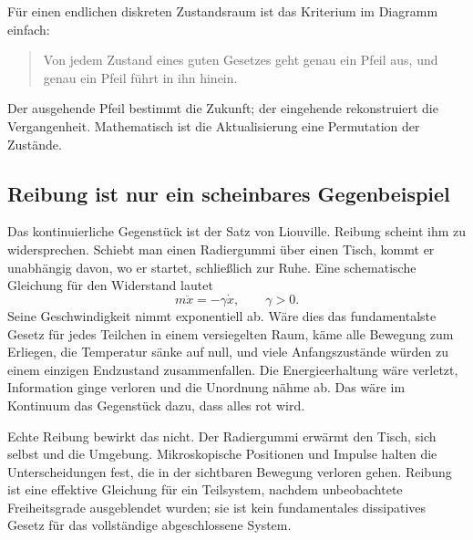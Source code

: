 Für einen endlichen diskreten Zustandsraum ist das Kriterium im Diagramm einfach:
\begin{quote}
Von jedem Zustand eines guten Gesetzes geht genau ein Pfeil aus, und genau ein Pfeil führt in ihn hinein.
\end{quote}
Der ausgehende Pfeil bestimmt die Zukunft; der eingehende rekonstruiert die Vergangenheit. Mathematisch ist die Aktualisierung eine Permutation der Zustände.

\subsection{Reibung ist nur ein scheinbares Gegenbeispiel}

Das kontinuierliche Gegenstück ist der Satz von Liouville. Reibung scheint ihm zu widersprechen. Schiebt man einen Radiergummi über einen Tisch, kommt er unabhängig davon, wo er startet, schließlich zur Ruhe. Eine schematische Gleichung für den Widerstand lautet
\begin{equation}
 m\ddot x=-\gamma\dot x,
 \qquad \gamma>0.
 \label{eq:sm1-drag}
\end{equation}
Seine Geschwindigkeit nimmt exponentiell ab. Wäre dies das fundamentalste Gesetz für jedes Teilchen in einem versiegelten Raum, käme alle Bewegung zum Erliegen, die Temperatur sänke auf null, und viele Anfangszustände würden zu einem einzigen Endzustand zusammenfallen. Die Energieerhaltung wäre verletzt, Information ginge verloren und die Unordnung nähme ab. Das wäre im Kontinuum das Gegenstück dazu, dass alles rot wird.

Echte Reibung bewirkt das nicht. Der Radiergummi erwärmt den Tisch, sich selbst und die Umgebung. Mikroskopische Positionen und Impulse halten die Unterscheidungen fest, die in der sichtbaren Bewegung verloren gehen. Reibung ist eine effektive Gleichung für ein Teilsystem, nachdem unbeobachtete Freiheitsgrade ausgeblendet wurden; sie ist kein fundamentales dissipatives Gesetz für das vollständige abgeschlossene System.

\begin{classroomqa}\end{classroomqa}

